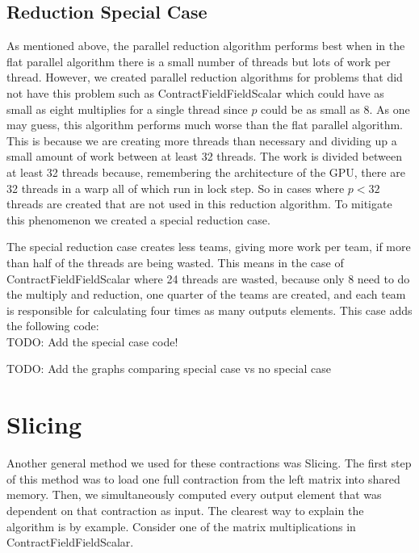 \subsection{Reduction Special Case}
As mentioned above, the parallel reduction algorithm performs best when in the flat parallel algorithm there is a small number of threads but lots of work per thread. However, we created parallel reduction algorithms for problems that did not have this problem such as ContractFieldFieldScalar which could have as small as eight multiplies for a single thread since $p$ could be as small as 8. As one may guess, this algorithm performs much worse than the flat parallel algorithm. This is because we are creating more threads than necessary and dividing up a small amount of work between at least 32 threads. The work is divided between at least 32 threads because, remembering the architecture of the GPU, there are 32 threads in a warp all of which run in lock step. So in cases where $p < 32$ threads are created that are not used in this reduction algorithm. To mitigate this phenomenon we created a special reduction case.

The special reduction case creates less teams, giving more work per team, if more than half of the threads are being wasted. This means in the case of ContractFieldFieldScalar where 24 threads are wasted, because only 8 need to do the multiply and reduction, one quarter of the teams are created, and each team is responsible for calculating four times as many outputs elements. This case adds the following code: \\
TODO: Add the special case code!

TODO: Add the graphs comparing special case vs no special case 
\section{Slicing}
Another general method we used for these contractions was Slicing. The first step of this method was to load one full contraction from the left matrix into shared memory. Then, we simultaneously computed every output element that was dependent on that contraction as input. The clearest way to explain the algorithm is by example. Consider one of the matrix multiplications in ContractFieldFieldScalar. 

